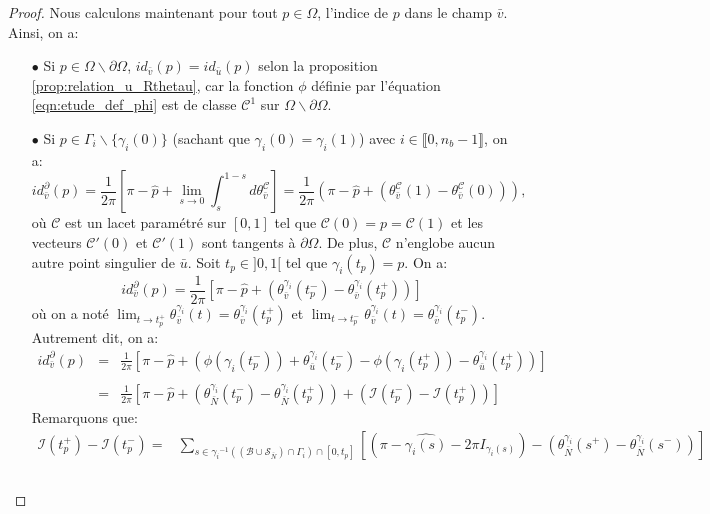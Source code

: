 \begin{proof}
    Nous calculons maintenant pour tout $p\in\Omega$, l'indice de $p$ dans le champ $\bar{v}$. Ainsi, on a:\\
    \begin{itemize}
        \item[$\bullet$] Si $p\in\Omega\backslash\partial\Omega$, $id_{\bar{v}}(p)=id_{\bar{u}}(p)$ selon la proposition \ref{prop:relation_u_Rthetau}, car la fonction $\phi$ définie par l'équation \eqref{eqn:etude_def_phi} est de classe $\mathcal{C}^1$ sur $\Omega\backslash\partial\Omega$.\\
        \item[$\bullet$] Si $p\in\Gamma_i\backslash\{\gamma_i(0)\}$ (sachant que $\gamma_i(0)=\gamma_i(1)$) avec $i\in\llbracket0, n_b-1\rrbracket$, on a:
        $$
        id^\partial_{\bar{v}}(p)=\frac{1}{2\pi}\left[\pi-\widehat{p}+\displaystyle\lim\limits_{s\rightarrow 0}\int_s^{1-s}d\theta_{\bar{v}}^{\mathcal{C}}\right]=\frac{1}{2\pi}\left(\pi-\widehat{p}+(\theta_{\bar{v}}^{\mathcal{C}}(1)-\theta_{\bar{v}}^{\mathcal{C}}(0))\right),
        $$
        où $\mathcal{C}$ est un lacet paramétré sur $[0, 1]$ tel que $\mathcal{C}(0)=p=\mathcal{C}(1)$ et les vecteurs $\mathcal{C}'(0)$ et $\mathcal{C}'(1)$ sont tangents à $\partial\Omega$. De plus, $\mathcal{C}$ n'englobe aucun autre point singulier de $\bar{u}$. Soit $t_p\in]0, 1[$ tel que $\gamma_i(t_p)=p$. On a:
        $$
        id^\partial_{\bar{v}}(p)=\frac{1}{2\pi}\left[\pi-\widehat{p}+\left(\theta_{\bar{v}}^{\gamma_i}(t_p^-)-\theta_{\bar{v}}^{\gamma_i}(t_p^+)\right)\right]
        $$
        où on a noté $\lim_{t\rightarrow t_p^+}\theta^{\gamma_i}_{\bar{v}}(t)=\theta^{\gamma_i}_{\bar{v}}(t_p^+)$ et $\lim_{t\rightarrow t_p^-}\theta^{\gamma_i}_{\bar{v}}(t)=\theta_{\bar{v}}^{\gamma_i}(t_p^-)$. Autrement dit, on a:
        $$
        \begin{array}{lcl}
        id^\partial_{\bar{v}}(p)&=&\displaystyle\frac{1}{2\pi}\left[\pi-\widehat{p}+\left(\phi(\gamma_i(t_p^-))+\theta_{\bar{u}}^{\gamma_i}(t_p^-)-\phi(\gamma_i(t_p^+))-\theta_{\bar{u}}^{\gamma_i}(t_p^+)\right)\right]\\\\
        &=&\displaystyle\frac{1}{2\pi}\left[\pi-\widehat{p}+\left(\theta_{\bar{N}}^{\gamma_i}(t_p^-)-\theta_{\bar{N}}^{\gamma_i}(t_p^+)\right)+\left(\mathcal{I}(t_p^-)-\mathcal{I}(t_p^+)\right)\right]
        \end{array}
        $$
        Remarquons que:
        $$
        \begin{array}{ll}
            \mathcal{I}(t_p^+)-\mathcal{I}(t_p^-)=&\displaystyle\sum_{s\in{\gamma_i}^{-1}((\mathcal{B}\cup\mathcal{S}_{\bar{N}})\cap\Gamma_i)\cap[0, t_p]}\left[\left(\pi-\widehat{\gamma_i(s)}-2\pi I_{\gamma_i(s)}\right)-\left(\theta^{\gamma_i}_{\bar{N}}(s^+) - \theta^{\gamma_i}_{\bar{N}}(s^-)\right)\right]\\\\

\end{array}$$
\end{itemize}
\end{proof}
